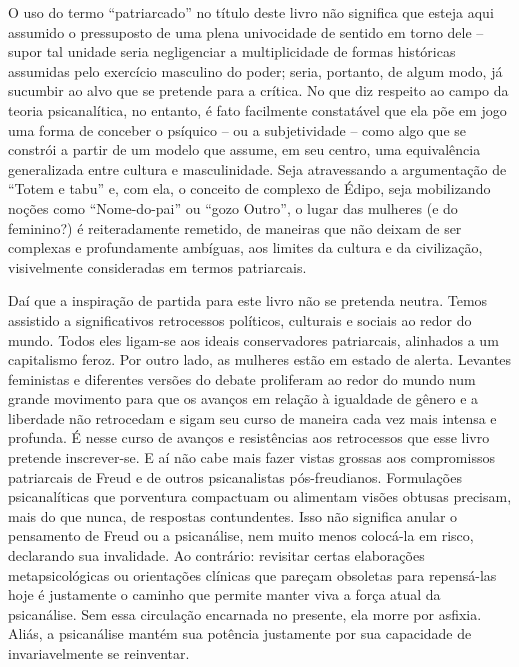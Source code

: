 O uso do termo ``patriarcado'' no título deste livro não significa que
esteja aqui assumido o pressuposto de uma plena univocidade de sentido
em torno dele -- supor tal unidade seria negligenciar a multiplicidade
de formas históricas assumidas pelo exercício masculino do poder; seria,
portanto, de algum modo, já sucumbir ao alvo que se pretende para a
crítica. No que diz respeito ao campo da teoria psicanalítica, no
entanto, é fato facilmente constatável que ela põe em jogo uma forma de
conceber o psíquico -- ou a subjetividade -- como algo que se constrói a
partir de um modelo que assume, em seu centro, uma equivalência
generalizada entre cultura e masculinidade. Seja atravessando a
argumentação de ``Totem e tabu'' e, com ela, o conceito de complexo de
Édipo, seja mobilizando noções como ``Nome-do-pai'' ou ``gozo Outro'', o
lugar das mulheres (e do feminino?) é reiteradamente remetido, de
maneiras que não deixam de ser complexas e profundamente ambíguas, aos
limites da cultura e da civilização, visivelmente consideradas em termos
patriarcais.

Daí que a inspiração de partida para este livro não se pretenda neutra.
Temos assistido a significativos retrocessos políticos, culturais e
sociais ao redor do mundo. Todos eles ligam-se aos ideais conservadores
patriarcais, alinhados a um capitalismo feroz. Por outro lado, as
mulheres estão em estado de alerta. Levantes feministas e diferentes
versões do debate proliferam ao redor do mundo num grande movimento para
que os avanços em relação à igualdade de gênero e a liberdade não
retrocedam e sigam seu curso de maneira cada vez mais intensa e
profunda. É nesse curso de avanços e resistências aos retrocessos que
esse livro pretende inscrever-se. E aí não cabe mais fazer vistas
grossas aos compromissos patriarcais de Freud e de outros psicanalistas
pós-freudianos. Formulações psicanalíticas que porventura compactuam ou
alimentam visões obtusas precisam, mais do que nunca, de respostas
contundentes. Isso não significa anular o pensamento de Freud ou a
psicanálise, nem muito menos colocá-la em risco, declarando sua
invalidade. Ao contrário: revisitar certas elaborações metapsicológicas
ou orientações clínicas que pareçam obsoletas para repensá-las hoje é
justamente o caminho que permite manter viva a força atual da
psicanálise. Sem essa circulação encarnada no presente, ela morre por
asfixia. Aliás, a psicanálise mantém sua potência justamente por sua
capacidade de invariavelmente se reinventar.

